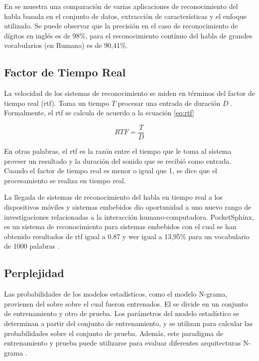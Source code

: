 En \cite{VimalaReview2012} se muestra una comparaci\'on de varias aplicaciones de reconocimiento del habla basada
en el conjunto de datos, extracci\'on de caracter\'isticas y el enfoque utilizado. Se puede observar que la precisi\'on
en el caso de reconocimiento de d\'igitos en ingl\'es es de 98\%, para el reconocimiento cont\'inuo del habla
de grandes vocabularios (en Rumano) es de 90,41\%.

\subsection{Factor de Tiempo Real}
\label{sec:rtf}

La velocidad de los sistemas de reconocimiento se miden en t\'erminos del factor de tiempo real (\gls{rtf}). 
Toma un tiempo $T$ procesar una entrada de duraci\'on $D$ \cite{VimalaReview2012}. 
Formalmente, el \gls{rtf} se calcula de acuerdo a la ecuaci\'on \eqref{eq:rtf}

\begin{equation}
\label{eq:rtf}
    RTF = \frac{T}{D}
\end{equation}

En otras palabras, el \gls{rtf} es la razón entre el tiempo que le toma al sistema proveer un resultado y la
duración del sonido que se recibió como entrada. Cuando el factor de tiempo real es menor o igual que 1, 
se dice que el procesamiento se realiza en tiempo real.

La llegada de sistemas de reconocimiento del habla en tiempo real a los dispositivos m\'oviles y sistemas embebidos dio
oportunidad a uno nuevo rango de investigaciones relacionadas a la interacci\'on humano-computadora. PocketSphinx, es
un sistema de reconocimiento para sistemas embebidos con el cual se han obtenido resultados de \gls{rtf} igual a 0.87 
y \gls{wer} igual a 13,95\% para un vocabulario de 1000 palabras \cite{HugginsDainesPocketSphinx2006}.

\subsection{Perplejidad}
\label{sec:perplexity}

Las probabilidades de los modelos estad\'isticos, como el modelo N-grama, provienen del  sobre
sobre el cual fueron entrenados. El  se divide en un conjunto de entrenamiento y otro de prueba.
Los par\'ametros del modelo estad\'istico se determinan a partir del conjunto de entrenamiento, y se utilizan
para calcular las probabilidades sobre el conjunto de prueba. Adem\'as, este paradigma de entrenamiento y prueba
puede utilizarse para evaluar diferentes arquitecturas N-grama \cite{Jurafsky}.


